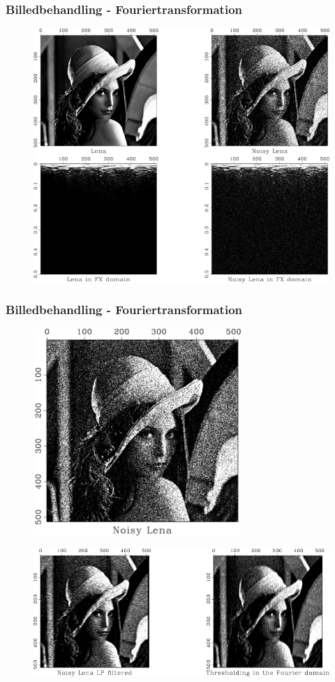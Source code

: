 \documentclass[12pt,t]{beamer}
\begin{document}
\begin{frame}
\frametitle{Billedbehandling - Fouriertransformation}
\begin{figure}[H]
\includegraphics[scale=0.33]{img/billedbeh/lenaex.png}
\end{figure}
\end{frame}

\begin{frame}
\frametitle{Billedbehandling - Fouriertransformation}
\begin{figure}[H]
\includegraphics[scale=0.29]{img/billedbeh/lenaex3.png}
\end{figure}
\begin{figure}[H]
\includegraphics[scale=0.29]{img/billedbeh/lenaex1.png}
\end{figure}
\end{frame}
\end{document}
